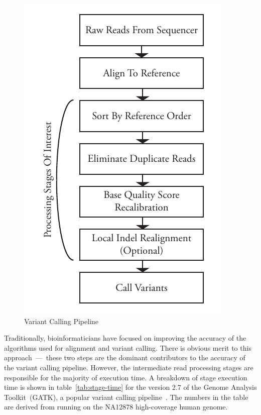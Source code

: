 \documentclass[10pt,twocolumn]{article}
\begin{document}
\begin{figure}[h]
\begin{center}
\includegraphics[width=0.9\linewidth]{pipeline.pdf}
\end{center}
\caption{Variant Calling Pipeline}
\label{fig:pipeline}
\end{figure}

Traditionally, bioinformaticians have focused on improving the accuracy of the algorithms used for alignment and variant
calling. There is obvious merit to this approach~---~these two steps are the dominant contributors to the accuracy of the variant
calling pipeline. However, the intermediate read processing stages are responsible for the majority of execution time. A
breakdown of stage execution time is shown in table~\ref{tab:stage-time} for the version 2.7 of the Genome Analysis
Toolkit~(GATK), a popular variant calling pipeline~\cite{mckenna10}. The numbers in the table are derived from running on
the NA12878 high-coverage human genome.
\end{document}
